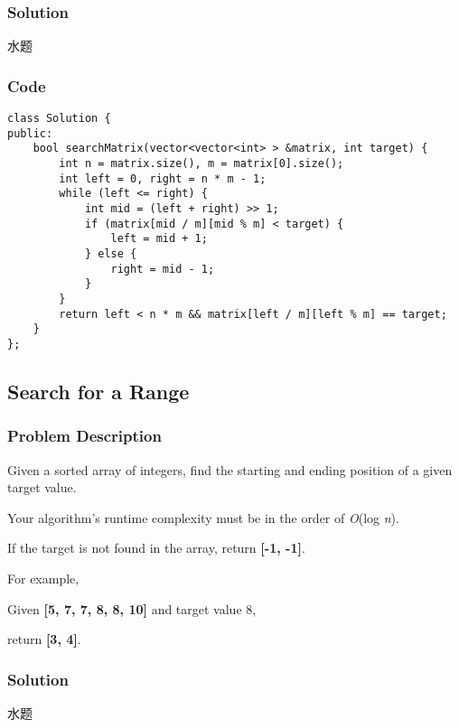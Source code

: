 \documentclass[courier]{article}
\begin{document}
\begin{CJK*}{UTF8}{gkai}
\subsubsection*{Solution}
水题

\subsubsection*{Code}
\begin{lstlisting}
class Solution {
public:
    bool searchMatrix(vector<vector<int> > &matrix, int target) {
        int n = matrix.size(), m = matrix[0].size();
        int left = 0, right = n * m - 1;
        while (left <= right) {
            int mid = (left + right) >> 1;
            if (matrix[mid / m][mid % m] < target) {
                left = mid + 1;
            } else {
                right = mid - 1;
            }
        }
        return left < n * m && matrix[left / m][left % m] == target;
    }
}; 
\end{lstlisting}


\subsection{ Search for a Range }

\subsubsection*{Problem Description}
Given a sorted array of integers, find the starting and ending position of a given target value.

Your algorithm's runtime complexity must be in the order of \emph{O}(log \emph{n}).

If the target is not found in the array, return \textbf{[-1, -1]}.

For example,


Given \textbf{[5, 7, 7, 8, 8, 10]} and target value 8,


return \textbf{[3, 4]}.



\subsubsection*{Solution}
水题


\end{CJK*}
\end{document}
